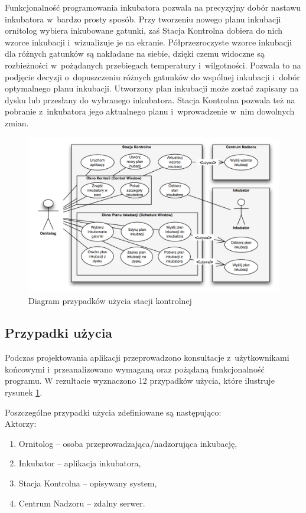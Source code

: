 Funkcjonalność programowania inkubatora pozwala na precyzyjny dobór nastawu inkubatora
w~bardzo prosty sposób. Przy tworzeniu nowego planu inkubacji ornitolog wybiera
inkubowane gatunki, zaś Stacja Kontrolna dobiera do nich wzorce inkubacji i~wizualizuje je na
ekranie. Półprzezroczyste wzorce inkubacji dla różnych gatunków są nakładane na siebie,
dzięki czemu widoczne są rozbieżności w~pożądanych przebiegach
temperatury i~wilgotności. Pozwala to na podjęcie decyzji o~dopuszczeniu różnych
gatunków do wspólnej inkubacji i~dobór optymalnego planu inkubacji. Utworzony
plan inkubacji może zostać zapisany na dysku lub przesłany do wybranego
inkubatora. Stacja Kontrolna pozwala też na pobranie z~inkubatora jego aktualnego planu
i~wprowadzenie w~nim dowolnych zmian.

\begin{figure}[b] 
\centering\includegraphics[width=\textwidth]{figures/CSUseCase}
\caption{Diagram przypadków użycia stacji kontrolnej}\label{rys:CSUseCase}
\end{figure}

\subsection{Przypadki użycia}
Podczas projektowania aplikacji przeprowadzono konsultacje z~użytkownikami końcowymi
i~przeanalizowano wymaganą oraz pożądaną funkcjonalność programu.
W rezultacie wyznaczono 12 przypadków użycia, które ilustruje rysunek \ref{rys:CSUseCase}. 
\pagebreak

\noindent Poszczególne przypadki użycia zdefiniowane są następująco:\\
Aktorzy:
\begin{enumerate}
	\item Ornitolog -- osoba przeprowadzająca/nadzorująca inkubację,
	\item Inkubator -- aplikacja inkubatora,
	\item Stacja Kontrolna -- opisywany system,
	\item Centrum Nadzoru -- zdalny serwer.
\end{enumerate}

